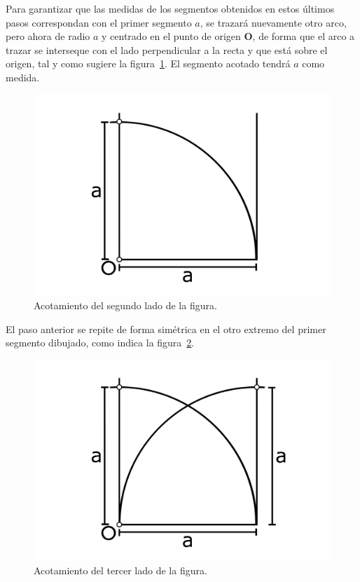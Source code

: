 Para garantizar que las medidas de los segmentos obtenidos en estos últimos pasos correspondan con el primer segmento $a$, se trazará nuevamente otro arco, pero ahora de radio $a$ y centrado en el punto de origen \textbf{O}, de forma que el arco a trazar se interseque con el lado perpendicular a la recta y que está sobre el origen, tal y como sugiere la figura~\ref{fig:TrazFig8}. El segmento acotado tendrá $a$ como medida. 

\begin{figure}[H]
\centering
\includegraphics[scale=0.75]{Figures/Cuad8}
\caption[Acotamiento del segundo lado de la figura.]{Acotamiento del segundo lado de la figura.}
\label{fig:TrazFig8}
\end{figure}

El paso anterior se repite de forma simétrica en el otro extremo del primer segmento dibujado, como indica la figura~\ref{fig:TrazFig9}.

\begin{figure}[H]
\centering
\includegraphics[scale=0.75]{Figures/Cuad9}
\caption[Acotamiento del tercer lado de la figura.]{Acotamiento del tercer lado de la figura.}
\label{fig:TrazFig9}
\end{figure}

